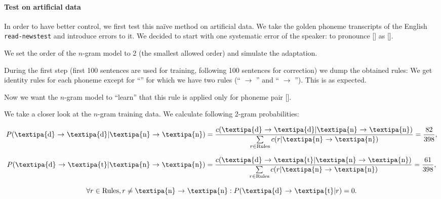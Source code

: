 \paragraph{Test on artificial data}
In order to have better control, we first test this na\"ive method on artificial data. We take the golden phoneme transcripts of the English \texttt{read-news\-test} and introduce errors to it. We decided to start with one systematic error of the speaker: to pronounce [] as []. 

We set the order of the $n$-gram model to 2 (the smallest allowed order) and simulate the adaptation. 

During the first step (first 100 sentences are used for training, following 100 sentences for correction) we dump the obtained rules: We get identity rules for each phoneme except for ``'' for which we have two rules (`` $\rightarrow$ '' and `` $\rightarrow$ ''). This is as expected. 

Now we want the $n$-gram model to ``learn'' that this rule is applied only for phoneme pair [].

We take a closer look at the $n$-gram training data. We calculate following 2-gram probabilities:

\begin{equation}\label{rule1}
	P( \textnormal{\textipa{d} $\rightarrow$ \textipa{d}} | \textnormal{\textipa{n} $\rightarrow$ \textipa{n}}) =
	\frac{
		c( \textnormal{\textipa{d} $\rightarrow$ \textipa{d}} | \textnormal{\textipa{n} $\rightarrow$ \textipa{n}})
	}{
		\sum\limits_{r \in \textnormal{Rules}} c( r | \textnormal{\textipa{n} $\rightarrow$ \textipa{n}})
	} =
	\frac{82}{398},
\end{equation}

\begin{equation}\label{rule2}
P( \textnormal{\textipa{d} $\rightarrow$ \textipa{t}} | \textnormal{\textipa{n} $\rightarrow$ \textipa{n}}) =
\frac{
	c( \textnormal{\textipa{d} $\rightarrow$ \textipa{t}} | \textnormal{\textipa{n} $\rightarrow$ \textipa{n}})
}{
	\sum\limits_{r \in \textnormal{Rules}} c( r | \textnormal{\textipa{n} $\rightarrow$ \textipa{n}})
} =
\frac{61}{398},
\end{equation}

\begin{equation}
\forall r \in \textnormal{Rules}, r \neq \textnormal{\textipa{n} $\rightarrow$ \textipa{n}}: P( \textnormal{\textipa{d} $\rightarrow$ \textipa{t}} | r) = 0.
\end{equation}

